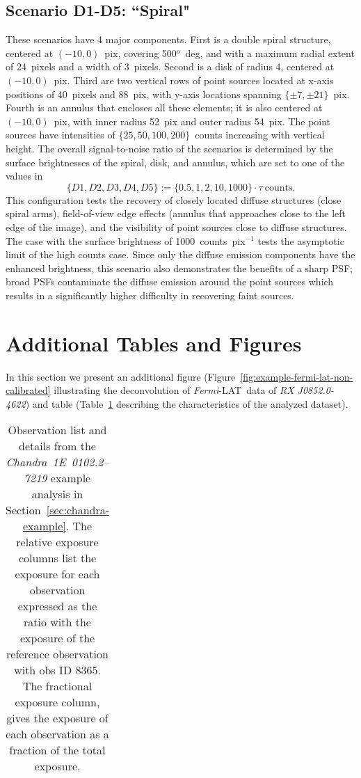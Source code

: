 \documentclass[twocolumn, linenumbers]{aastex631}
\newcommand{\chandra}{\textit{Chandra}~}
\newcommand{\fermi}{\textit{Fermi}-LAT~}
\begin{document}
    \subsection{Scenario D1-D5: ``Spiral"}
    These scenarios have 4 major components. First is a double spiral structure, centered at $(-10, 0)$~pix, covering 500$^o$~deg, and with a maximum radial extent of 24~pixels and a width of 3~pixels. Second is a disk of radius 4, centered at $(-10, 0)$~pix.  Third are two vertical rows of point sources located at x-axis positions of 40~pixels and 88~pix, with y-axis locations spanning $\{\pm7,\pm21\}$~pix. Fourth is an annulus that encloses all these elements; it is also centered at $(-10, 0)$~pix, with inner radius 52~pix and outer radius 54~pix.  
    The point sources have intensities of $\{25, 50, 100, 200\}$~counts increasing with vertical height. The overall signal-to-noise ratio of the scenarios is determined by the surface brightnesses of the spiral, disk, and annulus, which are set to one of the values in 
    $$\{D1, D2, D3, D4, D5 \} := \{0.5, 1, 2, 10, 1000\} \cdot \tau ~\textrm{counts}.$$  
    This configuration tests the recovery of closely located diffuse structures (close spiral arms), field-of-view edge effects (annulus that approaches close to the left edge of the image), and the visibility of point sources close to diffuse structures.  The case with the surface brightness of 1000~counts~pix$^{-1}$ tests the asymptotic limit of the high counts case.  Since only the diffuse emission components have the enhanced brightness, this scenario also demonstrates the benefits of a sharp PSF; broad PSFs contaminate the diffuse emission around the point sources which results in a significantly higher difficulty in recovering faint sources.
    
    \section{Additional Tables and Figures}    
    In this section we present an additional figure (Figure~\ref{fig:example-fermi-lat-non-calibrated} illustrating the deconvolution of \fermi data of \textit{RX J0852.0-4622}) and table (Table~\ref{tab:chandra_obs} describing the characteristics of the analyzed dataset).
    
    \label{sec:chandra-table}
    \begin{table}
    \centering
        \begin{tabular}{ c c c c c }
            
        \end{tabular}
        \label{tab:chandra_obs}
        \caption{Observation list and details from the \chandra \textit{1E~0102.2–7219} example analysis in Section~\ref{sec:chandra-example}. The relative exposure columns list the exposure for each observation expressed as the ratio with the exposure of the reference observation with obs ID 8365. The fractional exposure column, gives the exposure of each observation as a fraction of the total exposure.}
    \end{table}
\end{document}
